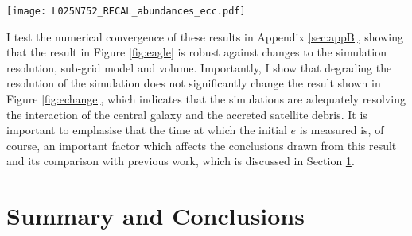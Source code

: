 \begin{figure*}
\texttt{[image: L025N752\_RECAL\_abundances\_ecc.pdf]}

\caption[The \mgfe{}-\feh{} abundances of the satellites accreted onto Milky Way mass haloes in the Recal-L025N0752 simulation of the EAGLE suite]{\label{fig:eagleabundances} Mean \mgfe{} and \feh{} of the
accreted satellites shown in Figures \ref{fig:eagle} and
\ref{fig:echange}. In both panels, point size and filling
indicate the number of particles of accreted systems, and morphology
of central galaxy, respectively, as in previous figures.  On the
right hand panel, colour denotes the masses of accreted satellites.
The same data are shown in the left hand panel, colour-coded by the
median eccentricity at $z=0$ of the debris.  The dashed and dotted
lines indicate roughly the locus of the disc stars of
MW-like central galaxies in the L025N752-Recal simulation \citep[see,
e.g.][]{2018MNRAS.477.5072M}. It is clear that the abundances of the stars in
the accreted satellites are roughly consistent with those seen in
halo stars in the APOGEE data (the median and 1$\sigma$ scatter of
the high $e$ group is shown by the black error bars).  Less massive
satellites have a large spread in \mgfe, but all have lower \feh{}
than the more massive satellites.  The increasing \feh{} with
satellite mass is very clear. The left hand panel shows that there
is a distinct lack of high eccentricity satellite debris at high
\mgfe{} and low \feh{}, such that, in general, high $e$ debris
occupies a similar locus to that of the high $e$ group in the
observed data.}

\end{figure*}

I test the numerical convergence of these results in Appendix
\ref{sec:appB}, showing that the result in Figure \ref{fig:eagle}
is robust against changes to the simulation resolution, sub-grid
model and volume. Importantly, I show that degrading the resolution
of the simulation does not significantly change the result shown
in Figure \ref{fig:echange}, which indicates that the simulations
are adequately resolving the interaction of the central galaxy and
the accreted satellite debris. It is important to emphasise that
the time at which the initial $e$ is measured is, of course, an
important factor which affects the conclusions drawn from this
result and its comparison with previous work, which is discussed 
in Section \ref{finale}.


\section{Summary and Conclusions} \label{finale}

